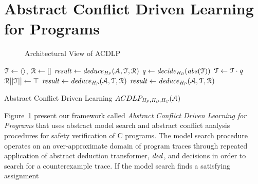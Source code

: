 \section{Abstract Conflict Driven Learning for Programs}
%
%
\begin{figure}[htbp]
\centering
\vspace*{-0.2cm}
\caption{Architectural View of ACDLP \label{acdlp-top}}
\end{figure}
%
\begin{algorithm2e}[t]
\DontPrintSemicolon
{}
\begin{small}
$\mathcal{T} \leftarrow \langle\rangle$, $\mathcal{R} \leftarrow []$ \;
$\mathit{result} \leftarrow \mathit{deduce}_{\mathit{H_P}}(\mathcal{A},\mathcal{T},\mathcal{R})$ \;
 {
  \return \safe}
{
 {
  \return \unsafe}
  $\mathit{q} \leftarrow \mathit{decide}_{\mathit{H_D}}(\mathit{abs}(\mathcal{T}))$ \;
  $\mathcal{T} \leftarrow \mathcal{T} \cdot \mathit{q}$ \; 
  $\mathcal{R}[|\mathcal{T}|] \leftarrow \top$ \;
  $\mathit{result} \leftarrow \mathit{deduce}_{\mathit{H_P}}(\mathcal{A},\mathcal{T},\mathcal{R})$\;
   {
    \lIf{$\neg \analyzeconflict_{\confheur}(\abstransset,\trail,\reasons)$} {
      \return \safe
    }
    $\mathit{result} \leftarrow \mathit{deduce}_{\mathit{H_P}}(\mathcal{A},\mathcal{T},\mathcal{R})$ \;
  }
}
\end{small}
\caption{Abstract Conflict Driven Learning $ACDLP_{\mathit{H_P},\mathit{H_D},\mathit{H_C}}(\mathcal{A})$ \label{Alg:acdcl}}
\end{algorithm2e}
%
Figure~\ref{acdlp-top} present our framework called \emph{Abstract Conflict 
Driven Learning for Programs} that uses abstract model search and abstract 
conflict analysis procedures for safety verification of C programs.  The model
search procedure operates on an over-approximate domain of program
traces through repeated application of abstract deduction transformer, 
$\mathit{ded}^{}$, and decisions in order to search for a counterexample trace.  
If the model search finds a satisfying assignment

